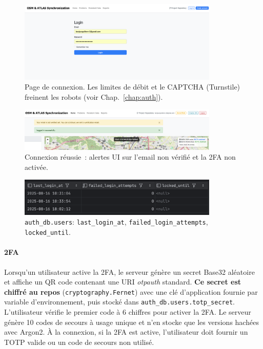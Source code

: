 \begin{figure}[H]
  \centering
  \includegraphics[width=0.85\textwidth]{../figures/chap10/login_page.png}
  \caption[Page de connexion]{Page de connexion. Les limites de débit et le CAPTCHA (Turnstile) freinent les robots (voir Chap.~\ref{chap:auth}).}
\end{figure}

\begin{figure}[H]
  \centering
  \includegraphics[width=0.85\textwidth]{../figures/chap10/login_succesful.png}
  \caption[Connexion réussie]{Connexion réussie : alertes UI sur l'email non vérifié et la 2FA non activée.}
\end{figure}

\begin{figure}[H]
  \centering
  \includegraphics[width=0.85\textwidth]{../figures/chap10/auth_db4.png}
  \caption[users — verrous]{\texttt{auth\_db.users}: \texttt{last\_login\_at}, \texttt{failed\_login\_attempts}, \texttt{locked\_until}.}
\end{figure}

\paragraph{2FA}
Lorsqu'un utilisateur active la 2FA, le serveur génère un secret Base32 aléatoire et affiche un QR code contenant une URI \textit{otpauth} standard. \textbf{Ce secret est chiffré au repos} (\texttt{cryptography.Fernet}) avec une clé d'application fournie par variable d'environnement, puis stocké dans \texttt{auth\_db.users.totp\_secret}. L'utilisateur vérifie le premier code à 6 chiffres pour activer la 2FA. Le serveur génère 10 codes de secours à usage unique et n'en stocke que les versions hachées avec Argon2. À la connexion, si la 2FA est active, l'utilisateur doit fournir un TOTP valide ou un code de secours non utilisé.

